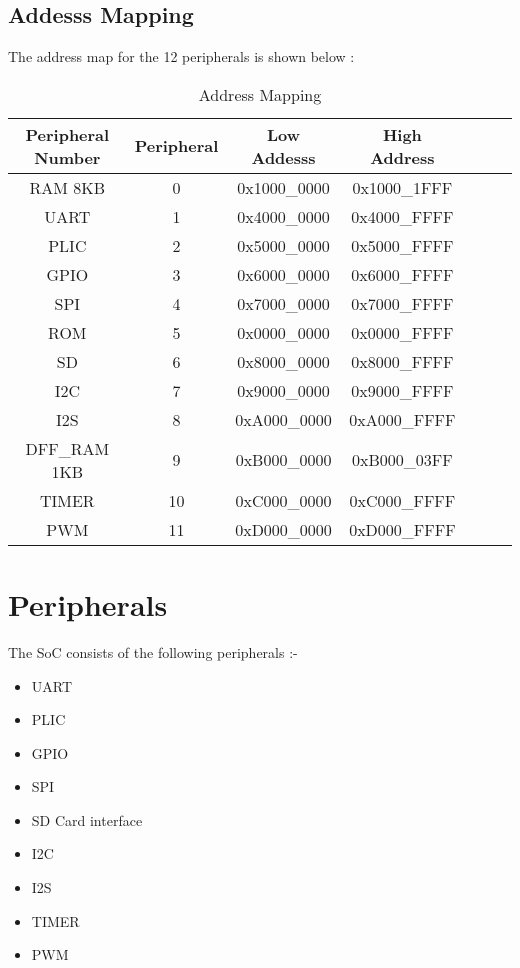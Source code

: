 \documentclass[12pt,a4paper]{report}
\begin{document}

\section{Addesss Mapping}

The address map for the 12 peripherals is shown below :
\begin{table} 
\begin{center}
\begin{tabular}{|c|c|c|c|c|c|c| } 
 \hline
Peripheral Number  &  Peripheral & Low Addesss & High Address  \\ 
\hline
RAM 8KB  &  0 & 0x1000\_0000 & 0x1000\_1FFF   \\
 \hline
UART & 1 & 0x4000\_0000 & 0x4000\_FFFF  \\
 \hline
PLIC & 2 & 0x5000\_0000 & 0x5000\_FFFF  \\
 \hline
GPIO & 3 & 0x6000\_0000 & 0x6000\_FFFF  \\
 \hline
SPI  & 4 & 0x7000\_0000 & 0x7000\_FFFF  \\
 \hline
ROM  & 5 & 0x0000\_0000 & 0x0000\_FFFF  \\
 \hline
SD  & 6 & 0x8000\_0000 & 0x8000\_FFFF  \\
 \hline
I2C  & 7 & 0x9000\_0000 & 0x9000\_FFFF  \\
 \hline
I2S  & 8 & 0xA000\_0000 & 0xA000\_FFFF  \\
 \hline
DFF\_RAM 1KB & 9 & 0xB000\_0000 & 0xB000\_03FF  \\
\hline
TIMER  & 10 & 0xC000\_0000 & 0xC000\_FFFF  \\
\hline
PWM  & 11 & 0xD000\_0000 & 0xD000\_FFFF  \\
\hline
\end{tabular}
\caption{\label{tab:mapping} Address Mapping}
\end{center}
\end{table}





\chapter{Peripherals}
\thispagestyle{logo}
The SoC consists of the following peripherals :-
\begin{itemize}
\item UART
\item PLIC
\item GPIO
\item SPI
\item SD Card interface
\item I2C
\item I2S
\item TIMER
\item PWM
\end{itemize}
\end{document}
